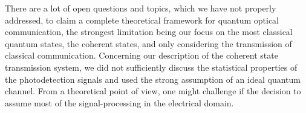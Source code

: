There are a lot of open questions and topics, which we have not properly addressed, to claim a complete theoretical framework for quantum optical communication, the strongest limitation being our focus on the most classical quantum states, the coherent states, and only considering the transmission of classical communication.
Concerning our description of the coherent state transmission system, we did not sufficiently discuss the statistical properties of the photodetection signals and used the strong assumption of an ideal quantum channel.
From a theoretical point of view, one might challenge if the decision to assume most of the signal-processing in the electrical domain.

